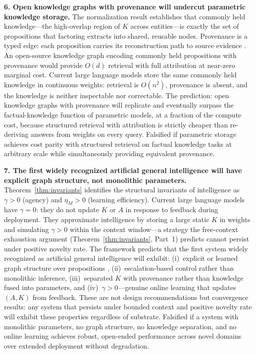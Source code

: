 \documentclass[11pt]{article}
\theoremstyle{definition}
\theoremstyle{remark}
\begin{document}
\textbf{6. Open knowledge graphs with provenance will undercut
parametric knowledge storage.}
The normalization result \cite{McCarthy2026c} establishes that
commonly held knowledge---the high-overlap region of $K$ across
entities---is exactly the set of propositions that factoring extracts
into shared, reusable nodes. Provenance is a typed edge:
each proposition carries its reconstruction path to source evidence
\cite{McCarthy2026a}. An open-source knowledge graph encoding commonly
held propositions with provenance would provide $O(d)$ retrieval with
full attribution at near-zero marginal cost. Current large language
models store the same commonly held knowledge in continuous weights:
retrieval is $O(n^2)$, provenance is absent, and the knowledge is
neither inspectable nor correctable. The prediction: open knowledge
graphs with provenance will replicate and eventually surpass the
factual-knowledge function of parametric models, at a fraction of
the compute cost, because structured retrieval with attribution is
strictly cheaper than re-deriving answers from weights on every query.
Falsified if parametric storage achieves cost parity with structured
retrieval on factual knowledge tasks at arbitrary scale while
simultaneously providing equivalent provenance.

\textbf{7. The first widely recognized artificial general intelligence
will have explicit graph structure, not monolithic parameters.}
Theorem~\ref{thm:invariants} identifies the structural invariants of
intelligence as $\gamma > 0$ (agency) and $\eta_M > 0$ (learning
efficiency). Current large language models have $\gamma = 0$: they do
not update $K$ or $A$ in response to feedback during deployment.
They approximate intelligence by storing a large static $K$ in weights
and simulating $\gamma > 0$ within the context window---a strategy
the free-context exhaustion argument
(Theorem~\ref{thm:invariants}, Part~1) predicts cannot persist under
positive novelty rate. The framework predicts that the first system
widely recognized as artificial general intelligence will exhibit:
(i)~explicit or learned graph structure over propositions
\cite{McCarthy2026a}, (ii)~escalation-based control
\cite{McCarthy2026b} rather than monolithic inference,
(iii)~separated $K$ with provenance rather than knowledge fused into
parameters, and (iv)~$\gamma > 0$---genuine online learning that
updates $(A, K)$ from feedback. These are not design recommendations
but convergence results: any system that persists under bounded context
and positive novelty rate will exhibit these properties regardless of
substrate. Falsified if a system with monolithic parameters, no graph
structure, no knowledge separation, and no online learning achieves
robust, open-ended performance across novel domains over extended
deployment without degradation.
\end{document}
